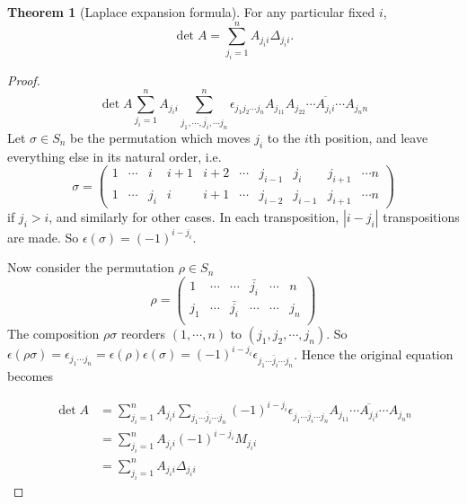 \documentclass[a4paper]{article}
\theoremstyle{definition}
\newtheorem*{thm}{Theorem}
\begin{document}
\begin{thm}[Laplace expansion formula]
  For any particular fixed $i$,
  \[
  \det A = \sum_{j_i = 1}^{n} A_{j_ii}\Delta_{j_ii}.
  \]
\end{thm}
\begin{proof}
  \[
  \det A\sum_{j_i = 1}^nA_{j_ii}\sum_{j_1, \cdots, \overline{j_i}, \cdots j_n}^n \epsilon_{j_1j_2\cdots j_n} A_{j_11}A_{j_22}\cdots \overline{A_{j_ii}}\cdots A_{j_nn}
  \]
  Let $\sigma \in S_n$ be the permutation which moves $j_i$ to the $i$th position, and leave everything else in its natural order, i.e.
  \[
  \sigma =
  \begin{pmatrix}
    1 &\cdots& i & i + 1 & i + 2 & \cdots &j_{i - 1}&j_i& j_{i + 1} & \cdots n\\
    1 & \cdots & j_i & i & i + 1 & \cdots & j_{i - 2} & j_{i - 1} & j_{i + 1} & \cdots n
  \end{pmatrix}
  \]
  if $j_i > i$, and similarly for other cases. In each transposition, $|i - j_i|$ transpositions are made. So $\epsilon(\sigma) = (-1)^{i - j_i}$.

  Now consider the permutation $\rho\in S_n$
  \[
  \rho =
  \begin{pmatrix}
    1 & \cdots & \cdots & \bar {j_i} & \cdots & n\\
    j_1 & \cdots & \bar{j_i} & \cdots & \cdots & j_n\\
  \end{pmatrix}
  \]
  The composition $\rho\sigma$ reorders $(1, \cdots, n)$  to $(j_1, j_2,\cdots, j_n)$. So $\epsilon(\rho\sigma) = \epsilon_{j_1\cdots j_n} = \epsilon(\rho)\epsilon(\sigma) = (-1)^{i - j_i} \epsilon_{j_1\cdots \bar j_i \cdots j_n}$. Hence the original equation becomes

\begin{align*}
  \det A &= \sum_{j_i = 1}^n A_{j_i i} \sum_{j_1\cdots \bar j_i\cdots j_n}(-1)^{i - j_i} \epsilon_{j_1\cdots \bar j_i \cdots j_n} A_{j_11}\cdots \overline{A_{j_ii}} \cdots A_{j_nn}\\
  &= \sum_{j_i = 1}^n A_{j_ii} (-1)^{i - j_i}M_{j_ii}\\
  &= \sum_{j_i = 1}^{n} A_{j_ii}\Delta_{j_ii}
\end{align*}
\end{proof}
\end{document}
